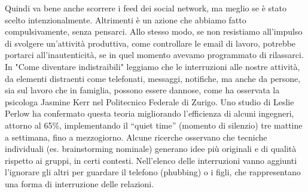 \documentclass[12pt]{book} %
\begin{document}
Quindi va bene anche scorrere i feed dei social network, ma meglio se è stato scelto intenzionalmente. Altrimenti è un  azione che abbiamo fatto compulsivamente, senza pensarci. Allo stesso modo, se non resistiamo all'impulso di svolgere un’attività produttiva, come controllare le email di lavoro, potrebbe portarci all'inautenticità, se in quel momento avevamo programmato di rilassarci. In "Come diventare indistraibili"  leggiamo che le interruzioni alle nostre attività, da elementi distraenti come telefonati, messaggi, notifiche, ma anche da persone, sia sul lavoro che in famiglia, possono essere dannose, come ha osservata la psicologa Jasmine Kerr nel Politecnico Federale di Zurigo.
Uno studio di Leslie Perlow ha confermato questa teoria migliorando l'efficienza di alcuni ingegneri, attorno al 65\%, implementando il “quiet time” (momento di silenzio) tre mattine a settimana, fino a mezzogiorno. Alcune ricerche osservano che tecniche individuali (es. brainstorming nominale) generano idee più originali e di qualità rispetto ai gruppi, in certi contesti.
Nell'elenco delle interruzioni vanno aggiunti l'ignorare gli altri per guardare il telefono (phubbing) o i figli, che rappresentano una forma di interruzione delle relazioni.
\end{document}
